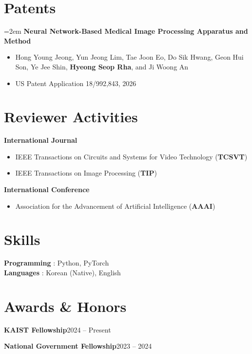 \documentclass[10pt,letterpaper]{article}
\newcommand{\lineentry}[2]{\textbf{#1}\hfill{\color{metagray}#2}\par}
\newcommand{\pub}[3]{%
  \begin{minipage}{\textwidth}
  {\hyphenpenalty=10000 \exhyphenpenalty=10000 \emergencystretch=2em \textbf{#1}\par}
  \begin{itemize}
    \item #2
    \item #3
  \end{itemize}
  \end{minipage}\par\vspace{5pt}
}
\begin{document}
\section{Patents}
\pub{Neural Network-Based Medical Image Processing Apparatus and Method}
    {Hong Young Jeong, Yun Jeong Lim, Tae Joon Eo, Do Sik Hwang, Geon Hui Son, Ye Jee Shin, \textbf{Hyeong Seop Rha}, and Ji Woong An}
    {US Patent Application 18/992,843, 2026}

\section{Reviewer Activities}
\textbf{International Journal}
\begin{itemize}
  \item IEEE Transactions on Circuits and Systems for Video Technology (\textbf{TCSVT})
  \item IEEE Transactions on Image Processing (\textbf{TIP})
\end{itemize}
\vspace{5pt}
\textbf{International Conference}
\begin{itemize}
  \item Association for the Advancement of Artificial Intelligence (\textbf{AAAI})
\end{itemize}

\section{Skills}
\textbf{Programming} : Python, PyTorch\\
\textbf{Languages} : Korean (Native), English

\section{Awards \& Honors}
\lineentry{KAIST Fellowship}{2024 -- Present}
\vspace{2pt}
\lineentry{National Government Fellowship}{2023 -- 2024}
\end{document}
